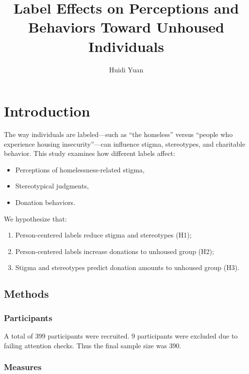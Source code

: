 \documentclass[
  man,
  floatsintext,
  longtable,
  nolmodern,
  notxfonts,
  notimes,
  colorlinks=true,linkcolor=blue,citecolor=blue,urlcolor=blue]{apa7}
\title{Label Effects on Perceptions and Behaviors Toward Unhoused
Individuals}
\author{Huidi Yuan}
\affiliation{
{University of Chicago}}
\providecommand{\tightlist}{%
  \setlength{\itemsep}{0pt}\setlength{\parskip}{0pt}}
\begin{document}
\maketitle


\setcounter{secnumdepth}{-\maxdimen} %

\setlength\LTleft{0pt}


\section{Introduction}\label{introduction}

The way individuals are labeled---such as ``the homeless'' versus
``people who experience housing insecurity''---can influence stigma,
stereotypes, and charitable behavior. This study examines how different
labels affect:

\begin{itemize}
\tightlist
\item
  Perceptions of homelessness-related stigma,
\item
  Stereotypical judgments,
\item
  Donation behaviors.
\end{itemize}

We hypothesize that:

\begin{enumerate}
\def\labelenumi{\arabic{enumi}.}
\tightlist
\item
  Person-centered labels reduce stigma and stereotypes (H1);
\item
  Person-centered labels increase donations to unhoused group (H2);
\item
  Stigma and stereotypes predict donation amounts to unhoused group
  (H3).
\end{enumerate}

\subsection{Methods}\label{methods}

\subsubsection{Participants}\label{participants}

A total of 399 participants were recruited. 9 participants were excluded
due to failing attention checks. Thus the final sample size was 390.

\subsubsection{Measures}\label{measures}
\end{document}
